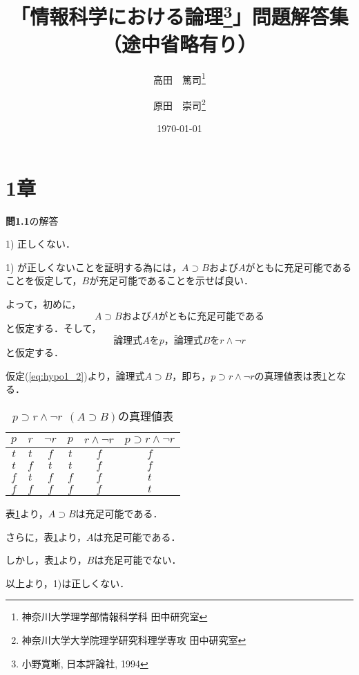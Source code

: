 \documentclass[11pt,dvipdfmx]{jreport}
\title{「情報科学における論理\footnote{小野寛晰, 日本評論社, 1994}」問題解答集（途中省略有り）}
\author{高田　篤司\thanks{神奈川大学理学部情報科学科 田中研究室} \and 原田　崇司\thanks{神奈川大学大学院理学研究科理学専攻 田中研究室}}
\date{\today}
\begin{document}
\maketitle

\section*{1章}

\noindent \textbf{問1.1}の解答
\par
1) 正しくない．
\par
1) が正しくないことを証明する為には，$A \supset B$および$A$がともに充足可能であることを仮定して，$B$が充足可能であることを示せば良い．
\par
よって，初めに，
\begin{equation}
 \textrm{$A \supset B$および$A$がともに充足可能である}
 \label{eq:hypo1_1}
\end{equation}
と仮定する．そして，
\begin{equation}
 \textrm{論理式$A$を$p$，論理式$B$を$r \land \lnot r$}
 \label{eq:hypo1_2}
\end{equation}
と仮定する．
\par
仮定(\ref{eq:hypo1_2})より，論理式$A \supset B$，即ち，$p \supset r \land \lnot r$の真理値表は表\ref{tb:AimpB}となる．
\begin{table}[!htbp]
 \centering
   \caption{$p \supset r \land \lnot r \ \ (A \supset B)$の真理値表}
   \vspace{3mm}
   \begin{tabular}{c|c|c|c|c|c}
    $p$ & $r$ & $\lnot r$ & $p$ & $r \land \lnot r$ & $p \supset r \land \lnot r$ \\ \hline
    $t$ & $t$ & $f$       & $t$       & $f$                     & $f$ \\ \hline
    $t$ & $f$ & $t$       & $t$       & $f$                     & $f$ \\ \hline
    $f$ & $t$ & $f$       & $f$       & $f$                     & $t$ \\ \hline
    $f$ & $f$ & $f$       & $f$       & $f$                     & $t$ 
   \end{tabular}
   \label{tb:AimpB}
\end{table}

表\ref{tb:AimpB}より，$A \supset B$は充足可能である．
\par
さらに，表\ref{tb:AimpB}より，$A$は充足可能である．
\par
しかし，表\ref{tb:AimpB}より，$B$は充足可能でない．
\par
以上より，1)は正しくない．
\end{document}
